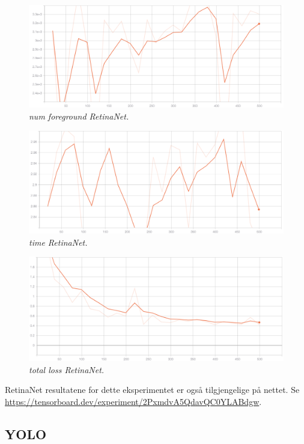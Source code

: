 \begin{figure}[h!]
\begin{center} 
\includegraphics[scale=0.35]{figures/num_foreground_6}
\caption{\small \sl num foreground RetinaNet. \label{fig:num_foreground}}
\end{center}
\end{figure}

\begin{figure}[h!]
\begin{center} 
\includegraphics[scale=0.35]{figures/time_retinanet_7}
\caption{\small \sl time RetinaNet. \label{fig:time_retinanet}}
\end{center}
\end{figure}

\begin{figure}[h!]
\begin{center} 
\includegraphics[scale=0.35]{figures/total_loss_retinanet_8}
\caption{\small \sl total loss RetinaNet. \label{fig:total_loss_retinanet}}
\end{center}
\end{figure}

RetinaNet resultatene for dette eksperimentet er også tilgjengelige på nettet. Se \\ \url{https://tensorboard.dev/experiment/2PxmdvA5QdavQC0YLABdgw}.

\subsection{YOLO}